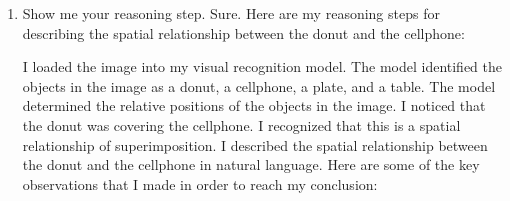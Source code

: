 \begin{enumerate}
\begin{enumerate}
        Here is a more detailed description of the spatial relationship between the donut and the cellphone:
        
        The donut is on a plate in the center of the table.
        The cellphone is on the plate underneath the donut.
        The donut is completely covering the cellphone.
        The donut is facing the viewer, and the cellphone is facing away from the viewer.
        I hope this helps! Let me know if you have any other questions.
        \item Show me your reasoning step.
        \subitem 
        Sure. Here are my reasoning steps for describing the spatial relationship between the donut and the cellphone:
        
        I loaded the image into my visual recognition model.
        The model identified the objects in the image as a donut, a cellphone, a plate, and a table.
        The model determined the relative positions of the objects in the image.
        I noticed that the donut was covering the cellphone.
        I recognized that this is a spatial relationship of superimposition.
        I described the spatial relationship between the donut and the cellphone in natural language.
        Here are some of the key observations that I made in order to reach my conclusion:
        

\end{enumerate}
\end{enumerate}
